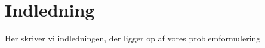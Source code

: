 \chapter{Indledning}\label{ch:introduction}
Her skriver vi indledningen, der ligger op af vores problemformulering

